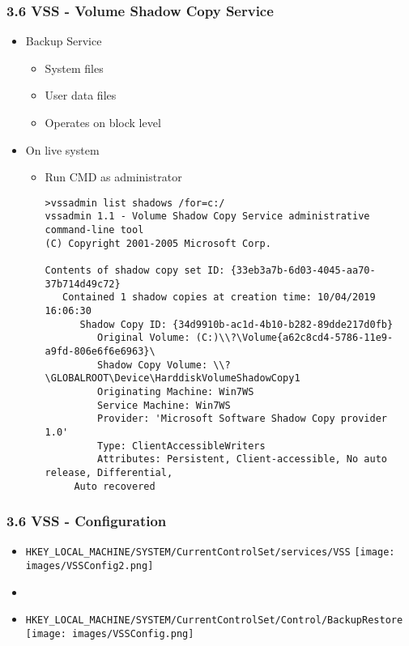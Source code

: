 \begin{frame}[fragile]
  \frametitle{3.6 VSS - Volume Shadow Copy Service}
    \begin{itemize}
	    \item Backup Service
            \begin{itemize}
	         \item System files
	         \item User data files
	         \item Operates on block level
            \end{itemize}
	    \item On live system
            \begin{itemize}
	         \item Run CMD as administrator
  \begin{lstlisting}[basicstyle=\tiny]
>vssadmin list shadows /for=c:/
vssadmin 1.1 - Volume Shadow Copy Service administrative command-line tool
(C) Copyright 2001-2005 Microsoft Corp.

Contents of shadow copy set ID: {33eb3a7b-6d03-4045-aa70-37b714d49c72}
   Contained 1 shadow copies at creation time: 10/04/2019 16:06:30
      Shadow Copy ID: {34d9910b-ac1d-4b10-b282-89dde217d0fb}
         Original Volume: (C:)\\?\Volume{a62c8cd4-5786-11e9-a9fd-806e6f6e6963}\
         Shadow Copy Volume: \\?\GLOBALROOT\Device\HarddiskVolumeShadowCopy1
         Originating Machine: Win7WS
         Service Machine: Win7WS
         Provider: 'Microsoft Software Shadow Copy provider 1.0'
         Type: ClientAccessibleWriters
         Attributes: Persistent, Client-accessible, No auto release, Differential,
	 Auto recovered
  \end{lstlisting}
            \end{itemize}
  \end{itemize}
\end{frame}


\begin{frame}[fragile]
  \frametitle{3.6 VSS - Configuration}
	    \begin{itemize}
		    \item[] \scriptsize{\texttt{HKEY\_LOCAL\_MACHINE/SYSTEM/CurrentControlSet/services/VSS}}
		    \texttt{[image: images/VSSConfig2.png]}
		    \item[]
	    \item[] \scriptsize{\texttt{HKEY\_LOCAL\_MACHINE/SYSTEM/CurrentControlSet/Control/BackupRestore}}
		    \texttt{[image: images/VSSConfig.png]}
            \end{itemize}
\end{frame}


